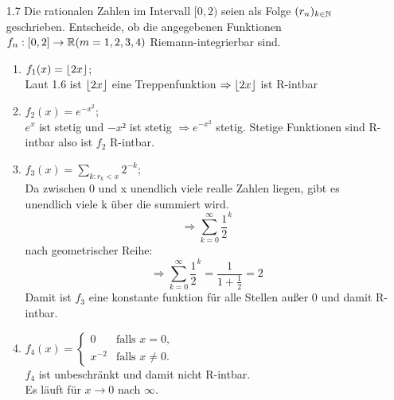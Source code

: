 \documentclass{HM}
\begin{document}
\begin{enumerate}
		\item[1.7] Die rationalen Zahlen im Intervall $[0,2)$ seien als Folge $(r_n)_{k\in\mathbb{N}}$ geschrieben. Entscheide, ob die angegebenen Funktionen $f_n:[0,2]\to\mathbb{R}(m=1,2,3,4)$ Riemann-integrierbar sind.
		\begin{enumerate}
			\item $f_1(x)=\lfloor2x\rfloor$;\\
			Laut 1.6 ist $\lfloor2x\rfloor$ eine Treppenfunktion $\Rightarrow \lfloor2x\rfloor$ ist R-intbar\\

			\item $f_2(x)=e^{-x^{2}}$;\\
			$e^x$ ist stetig und $-x²$ ist stetig $\Rightarrow e^{-x^2}$ stetig. Stetige Funktionen sind R-intbar also ist $f_2$ R-intbar. \\

			\item $f_3(x)=\sum\limits_{k:r_k<x}2^{-k}$;\\
			
			Da zwischen 0 und x unendlich viele realle Zahlen liegen, gibt es unendlich viele k über die summiert wird. $$\Rightarrow\sum_{k=0}^{\infty}\frac{1}{2}^k$$
			nach geometrischer Reihe:
			$$\Rightarrow\sum_{k=0}^{\infty}\frac{1}{2}^k = \frac{1}{1+\frac{1}{2}}=2$$
			Damit ist $f_3$ eine konstante funktion für alle Stellen außer 0 und damit R-intbar.\\

			\item $f_4(x)=\begin{cases}
				0&\text{falls }x=0,\\
				x^{-2}&\text{falls }x\neq 0.
			\end{cases}$\\
		
			$f_4$ ist unbeschränkt und damit nicht R-intbar.\\
			Es läuft für $x\to0$ nach $\infty$.
		\end{enumerate}


\end{enumerate}
\end{document}
